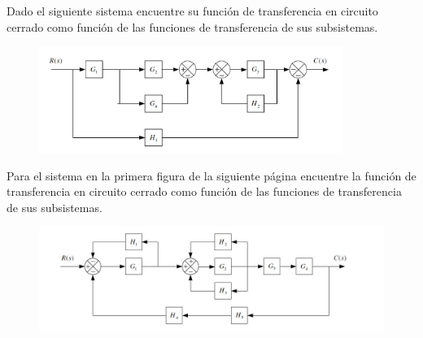 \documentclass[ a4paper, twoside, 11pt]{article}
\begin{document}
\begin{problem}
Dado el siguiente sistema encuentre su funci\'on de transferencia en circuito cerrado como funci\'on de las funciones de transferencia de sus subsistemas. 

\begin{figure}[htb]
\centering
\includegraphics[width=0.88\textwidth]{figures/bloques2.JPG}
\end{figure}

\end{problem}
\vspace{\baselineskip}

\begin{problem}
Para el sistema en la primera figura de la siguiente p\'agina encuentre la funci\'on de transferencia en circuito cerrado como funci\'on de las funciones de transferencia de sus subsistemas. 

\begin{figure}[htb]
\centering
\includegraphics[width=\textwidth]{figures/bloques3.JPG}
\end{figure}

\end{problem}
\vspace{\baselineskip}
\end{document}
